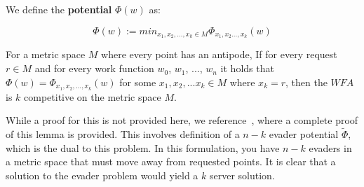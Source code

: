 \begin{definition}
    We define the \textbf{potential} $\Phi (w)$ as:

    \begin{equation*}
        \Phi(w) := min_{x_1, x_2, ..., x_k \in M} \Phi_{x_1, x_2..., x_k} (w)
    \end{equation*}
\end{definition}

\begin{lemma}
    For a metric space $M$ where every point has an antipode, If for every request $r \in M$ and for every work function $w_0$, $w_1$, ..., $w_n$ it holds that $\Phi(w) = \Phi_{x_1, x_2, ..., x_k}(w)$ for some $x_1, x_2, ...x_k \in M$ where $x_k = r$, then the $WFA$ is $k$ competitive on the metric space $M$.
\end{lemma}

While a proof for this is not provided here, we reference~\cite{unifyingPotential2021}, where a complete proof of this lemma is provided. This involves definition of a $n-k$ evader potential $\tilde{\Phi}$, which is the dual to this problem. In this formulation, you have $n-k$ evaders in a metric space that must move away from requested points. It is clear that a solution to the evader problem would yield a $k$ server solution.